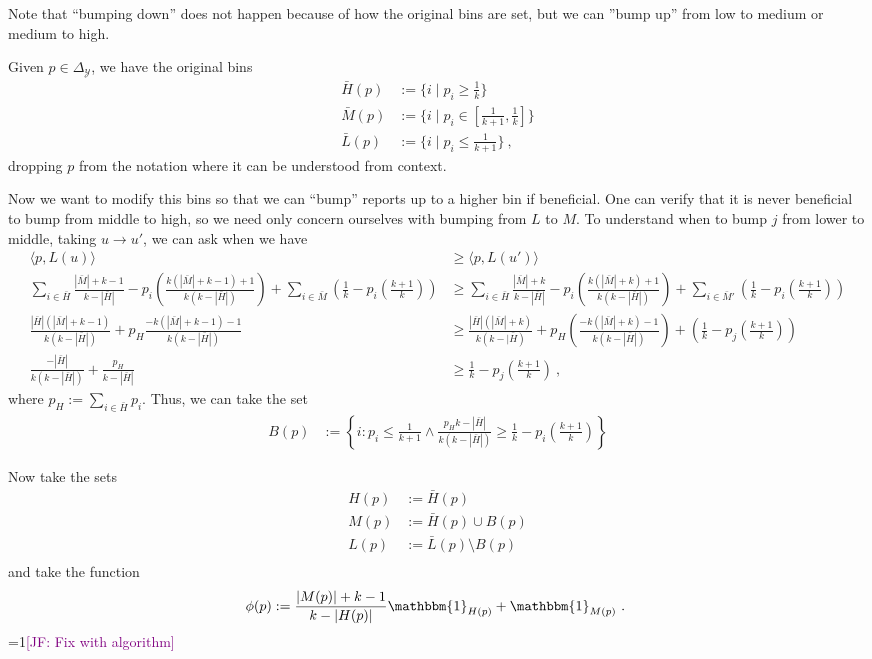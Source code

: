 \documentclass[12pt]{article}
\newcommand{\Comments}{1}
\newcommand{\mynote}[2]{\ifnum\Comments=1\textcolor{#1}{#2}\fi}
\newcommand{\jessie}[1]{\mynote{purple}{[JF: #1]}}
\newcommand{\simplex}{\Delta_\Y}
\newcommand{\Y}{\mathcal{Y}}
\newcommand{\inprod}[2]{\langle #1, #2 \rangle}%
\newcommand{\ones}{\mathbbm{1}}
\begin{document}
Note that ``bumping down'' does not happen because of how the original bins are set, but we can ''bump up'' from low to medium or medium to high.

Given $p \in \simplex$, we have the original bins
\begin{align*}
\bar H(p) &:= \{i \mid p_i \geq \frac 1 k\}\\
\bar M(p) &:= \{i \mid p_i \in [\frac 1 {k+1}, \frac 1 k]\} \\
\bar L(p) &:= \{i \mid p_i \leq \frac 1 {k+1}\}~,~
\end{align*}
dropping $p$ from the notation where it can be understood from context.

Now we want to modify this bins so that we can ``bump'' reports up to a higher bin if beneficial.
One can verify that it is never beneficial to bump from middle to high, so we need only concern ourselves with bumping from $L$ to $M$.
To understand when to bump $j$ from lower to middle, taking $u \to u'$, we can ask when we have
\begin{align*}
\inprod{p}{L(u)} &\geq \inprod{p}{L(u')}\\
\sum_{i \in \bar H} \frac{|\bar M| + k -1}{k-|\bar H|} - p_i \left(\frac{k(|\bar M| + k -1)+ 1}{k(k- |\bar H|)}\right) + \sum_{i \in \bar M} \left(\frac 1 k - p_i \left( \frac {k+1}{k}\right)\right) &\geq \sum_{i \in \bar H} \frac{|\bar M| + k }{k-|\bar H|} - p_i \left(\frac{k(|\bar M| + k)+ 1}{k(k- |\bar H|)}\right) + \sum_{i \in \bar M'} \left(\frac 1 k - p_i \left( \frac {k+1}{k}\right)\right)\\
\frac{|\bar H|(|\bar M| + k - 1)}{k(k- |\bar H|)} + p_H \frac{-k(|\bar M| + k - 1) - 1}{k(k - |\bar H|)} &\geq \frac{|\bar H|(|\bar M| + k)}{k(k - |\bar H)} + p_H \left(\frac{-k(|\bar M| + k)-1}{k (k - |\bar H|)}\right) + \left(\frac 1 k - p_j \left(\frac {k+1}{k}\right)\right) \\
\frac{-|\bar H|}{k (k - |\bar H|)} + \frac{p_H}{k - |\bar H|} &\geq \frac 1 k - p_j \left(\frac{k+1}{k}\right)~,~
\end{align*}
where $p_H := \sum_{i \in \bar H} p_i$.
Thus, we can take the set 
\begin{align}
B(p) &:= \left\{i : p_i \leq \frac{1}{k+1} \wedge \frac{p_H k- |\bar H|}{k(k- |\bar H|)} \geq \frac 1 k - p_i\left(\frac{k+1}{k}\right) \right\}
\end{align}

Now take the sets
\begin{align*}
H(p) &:= \bar H(p) \\
M(p) &:= \bar H(p) \cup B(p) \\
L(p) &:= \bar L(p) \setminus B(p)\\
\end{align*}
and take the function 
\begin{align}
\phi(p) := \frac{|M(p)| + k - 1}{k-|H(p)|} \ones_{H(p)} + \ones_{M(p)}~.~
\end{align}
\jessie{Fix with algorithm}
\end{document}
